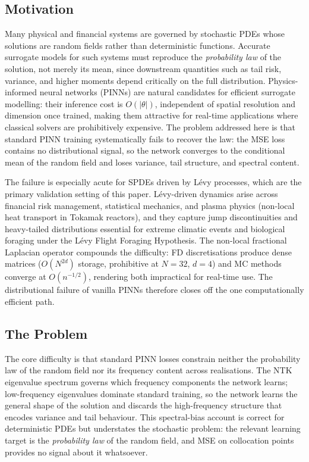 \documentclass[review,12pt]{elsarticle}
\begin{document}
\subsection{Motivation}
\label{subsec:motivation}

Many physical and financial systems are governed by stochastic PDEs
whose solutions are random fields rather than deterministic functions.
Accurate surrogate models for such systems must reproduce the
\emph{probability law} of the solution, not merely its mean, since
downstream quantities such as tail risk, variance, and higher moments
depend critically on the full distribution.
Physics-informed neural networks (PINNs) are natural candidates for
efficient surrogate modelling: their inference cost is \(O(|\theta|)\),
independent of spatial resolution and dimension once trained, making
them attractive for real-time applications where classical solvers are
prohibitively expensive.
The problem addressed here is that standard PINN training systematically
fails to recover the law: the MSE loss contains no distributional
signal, so the network converges to the conditional mean of the random
field and loses variance, tail structure, and spectral content.

The failure is especially acute for SPDEs driven by L\'evy processes,
which are the primary validation setting of this paper.
L\'evy-driven dynamics arise across financial risk management,
statistical mechanics, and plasma physics (non-local heat transport in
Tokamak reactors), and they capture jump discontinuities and
heavy-tailed distributions essential for extreme climatic events and
biological foraging under the L\'evy Flight Foraging Hypothesis.
The non-local fractional Laplacian operator compounds the difficulty:
FD discretisations produce dense matrices (\(O(N^{2d})\) storage,
prohibitive at \(N=32\), \(d=4\)) and MC methods converge at
\(O(n^{-1/2})\), rendering both impractical for real-time use.
The distributional failure of vanilla PINNs therefore closes off the
one computationally efficient path.

\subsection{The Problem}
\label{subsec:problem}

The core difficulty is that standard PINN losses constrain neither the
probability law of the random field nor its frequency content across
realisations. The NTK eigenvalue spectrum governs which frequency
components the network learns; low-frequency eigenvalues dominate
standard training, so the network learns the general shape of the
solution and discards the high-frequency structure that encodes
variance and tail behaviour. This spectral-bias account is correct for
deterministic PDEs but understates the stochastic problem: the
relevant learning target is the \emph{probability law} of the random
field, and MSE on collocation points provides no signal about it
whatsoever.
\end{document}
